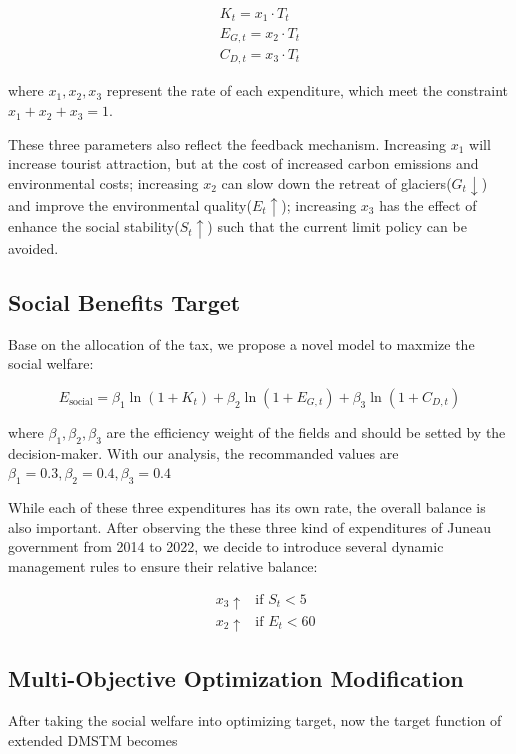 \documentclass{mcmthesis}
\begin{document}
\begin{gather}
  K_t = x_1 \cdot T_t  \\
  E_{G,t} = x_2 \cdot T_t  \\
  C_{D,t} = x_3 \cdot T_t 
\end{gather}

where $x_1, x_2, x_3$ represent the rate of each expenditure, which meet the constraint $x_1 + x_2 + x_3 = 1$.

These three parameters also reflect the feedback mechanism. Increasing $x_1$ will increase tourist attraction, 
but at the cost of increased carbon emissions and environmental costs; increasing $x_2$ can slow down the retreat
of glaciers($G_t \downarrow$) and improve the environmental quality($E_t \uparrow$); increasing $x_3$ has the effect of
enhance the social stability($S_t\uparrow$) such that the current limit policy can be avoided.

\subsection{Social Benefits Target}
Base on the allocation of the tax, we propose a novel model to maxmize the social welfare:

\begin{equation}
  E_{\text{social}} = \beta_1 \ln(1+K_t) + \beta_2 \ln(1 + E_{G,t}) + \beta_3 \ln(1 + C_{D,t})
\end{equation}

where $\beta_1, \beta_2, \beta_3$ are the efficiency weight of the fields and should be setted by the decision-maker.
With our analysis, the recommanded values are $\beta_1=0.3, \beta_2=0.4, \beta_3=0.4$

While each of these three expenditures has its own rate, the overall balance is also important. After observing the 
these three kind of expenditures of Juneau government from 2014 to 2022, we decide to introduce several 
dynamic management rules to ensure their relative balance:

\begin{equation}
\begin{aligned}
  & x_3\uparrow & \text{if } S_t < 5 \\
  & x_2\uparrow & \text{if } E_t < 60  
\end{aligned}
\end{equation}

\subsection{Multi-Objective Optimization Modification}
After taking the social welfare into optimizing target, now the target function of extended DMSTM becomes 
\end{document}
